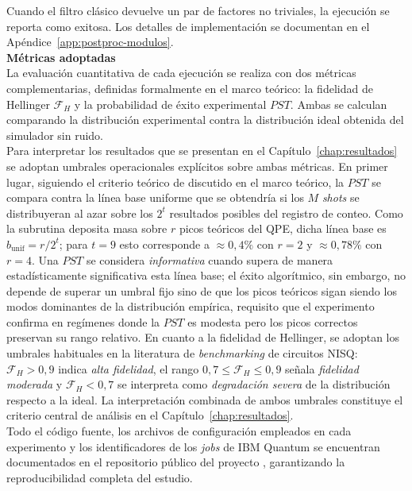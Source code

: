 \documentclass[12pt, spanish]{book}
\begin{document}
Cuando el filtro clásico devuelve un par de factores no triviales, la ejecución se reporta como exitosa. Los detalles de implementación se documentan en el Apéndice~\ref{app:postproc-modulos}.\\

\textbf{Métricas adoptadas}\\

La evaluación cuantitativa de cada ejecución se realiza con dos métricas complementarias, definidas formalmente en el marco teórico: la fidelidad de Hellinger $\mathcal{F}_H$ y la probabilidad de éxito experimental $PST$. Ambas se calculan comparando la distribución experimental contra la distribución ideal obtenida del simulador sin ruido.\\

Para interpretar los resultados que se presentan en el Capítulo~\ref{chap:resultados} se adoptan umbrales operacionales explícitos sobre ambas métricas. En primer lugar, siguiendo el criterio teórico de \cite{Bagourd2026} discutido en el marco teórico, la $PST$ se compara contra la línea base uniforme que se obtendría si los $M$ \textit{shots} se distribuyeran al azar sobre los $2^t$ resultados posibles del registro de conteo. Como la subrutina deposita masa sobre $r$ picos teóricos del QPE, dicha línea base es $b_{\text{unif}} = r/2^t$; para $t = 9$ esto corresponde a $\approx 0{,}4\%$ con $r = 2$ y $\approx 0{,}78\%$ con $r = 4$. Una $PST$ se considera \emph{informativa} cuando supera de manera estadísticamente significativa esta línea base; el éxito algorítmico, sin embargo, no depende de superar un umbral fijo sino de que los picos teóricos sigan siendo los modos dominantes de la distribución empírica, requisito que el experimento confirma en regímenes donde la $PST$ es modesta pero los picos correctos preservan su rango relativo. En cuanto a la fidelidad de Hellinger, se adoptan los umbrales habituales en la literatura de \textit{benchmarking} de circuitos NISQ: $\mathcal{F}_H > 0{,}9$ indica \textit{alta fidelidad}, el rango $0{,}7 \leq \mathcal{F}_H \leq 0{,}9$ señala \textit{fidelidad moderada} y $\mathcal{F}_H < 0{,}7$ se interpreta como \textit{degradación severa} de la distribución respecto a la ideal. La interpretación combinada de ambos umbrales constituye el criterio central de análisis en el Capítulo~\ref{chap:resultados}.\\

Todo el código fuente, los archivos de configuración empleados en cada experimento y los identificadores de los \textit{jobs} de IBM Quantum se encuentran documentados en el repositorio público del proyecto \cite{compuertas_CNOT}, garantizando la reproducibilidad completa del estudio.
\end{document}
